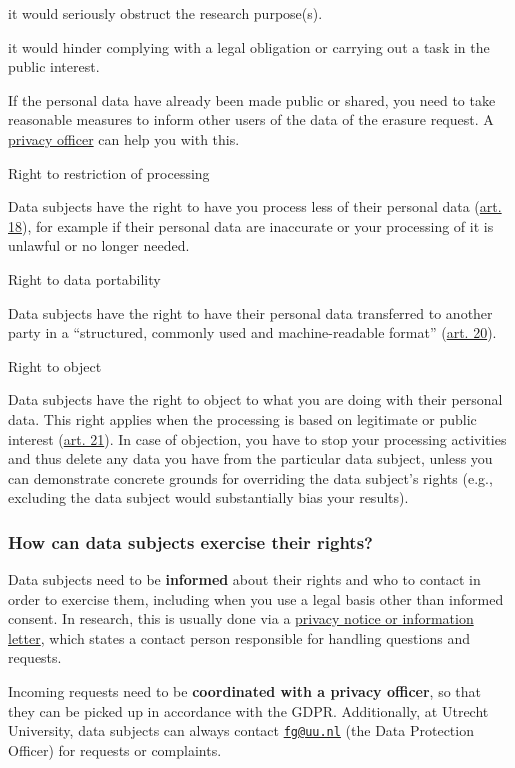\documentclass[
]{book}
\begin{document}
it would seriously obstruct the research purpose(s).

it would hinder complying with a legal obligation or carrying out a task
in the public interest.

If the personal data have already been made public or shared, you need to
take reasonable measures to inform other users of the data of the erasure
request. A \protect\hyperlink{support}{privacy officer} can help you with this.

Right to restriction of processing

Data subjects have the right to have you process less of their personal data
(\href{https://gdpr-info.eu/art-18-gdpr/}{art. 18}),
for example if their personal data are inaccurate or your processing of it
is unlawful or no longer needed.

Right to data portability

Data subjects have the right to have their personal data transferred to
another party in a ``structured, commonly used and machine-readable format''
(\href{https://gdpr-info.eu/art-20-gdpr/}{art. 20}).

Right to object

Data subjects have the right to object to what you are doing with their
personal data. This right applies when the processing is based on legitimate
or public interest (\href{https://gdpr-info.eu/art-21-gdpr/}{art. 21}).
In case of objection, you have to stop your processing activities and thus
delete any data you have from the particular data subject, unless you can
demonstrate concrete grounds for overriding the data subject's rights
(e.g., excluding the data subject would substantially bias your results).

\hypertarget{how-can-data-subjects-exercise-their-rights}{%
\subsubsection{How can data subjects exercise their rights?}\label{how-can-data-subjects-exercise-their-rights}}

Data subjects need to be \textbf{informed} about their rights and who to contact in
order to exercise them, including when you use a legal basis other than informed
consent. In research, this is usually done via a
\protect\hyperlink{privacy-notices}{privacy notice or information letter}, which states
a contact person responsible for handling questions and requests.

Incoming requests need to be \textbf{coordinated with a privacy officer}, so that
they can be picked up in accordance with the GDPR. Additionally, at Utrecht
University, data subjects can always contact
\href{mailto:fg@uu.nl}{\nolinkurl{fg@uu.nl}} (the Data Protection Officer) for
requests or complaints.
\end{document}
